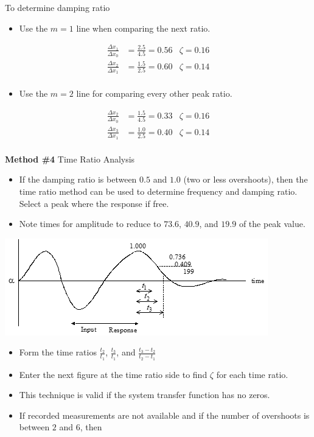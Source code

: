 \documentclass[
]{book}
\providecommand{\tightlist}{%
  \setlength{\itemsep}{0pt}\setlength{\parskip}{0pt}}
\begin{document}
To determine damping ratio

\begin{itemize}
\tightlist
\item
  Use the \(m = 1\) line when comparing the next ratio.
\end{itemize}

\begin{align}
\frac{\Delta x_1}{\Delta x_0} &= \frac{2.5}{4.5} = 0.56 & \zeta = 0.16 \\
\frac{\Delta x_2}{\Delta x_1} &= \frac{1.5}{2.5} = 0.60 & \zeta = 0.14 \\
\end{align}

\begin{itemize}
\tightlist
\item
  Use the \(m = 2\) line for comparing every other peak ratio.
\end{itemize}

\begin{align}
\frac{\Delta x_2}{\Delta x_0} &= \frac{1.5}{4.5} = 0.33 & \zeta = 0.16 \\
\frac{\Delta x_3}{\Delta x_1} &= \frac{1.0}{2.5} = 0.40 & \zeta = 0.14 \\
\end{align}

\textbf{Method \#4} Time Ratio Analysis

\begin{itemize}
\tightlist
\item
  If the damping ratio is between \(0.5\) and \(1.0\) (two or less overshoots), then the time ratio method can be used to determine frequency and damping ratio. Select a peak where the response if free.
\item
  Note times for amplitude to reduce to \(73.6%
  \), \(40.9%
  \), and \(19.9%
  \) of the peak value.
\end{itemize}

\includegraphics{media/08/image75.png}

\begin{itemize}
\tightlist
\item
  Form the time ratios \(\frac{t_2}{t_1}\), \(\frac{t_3}{t_1}\), and \(\frac{t_3 - t_2}{t_2 - t_1}\)
\item
  Enter the next figure at the time ratio side to find \(\zeta\) for each time ratio.
\item
  This technique is valid if the system transfer function has no zeros.
\item
  If recorded measurements are not available and if the number of overshoots is between \(2\) and \(6\), then
\end{itemize}
\end{document}

